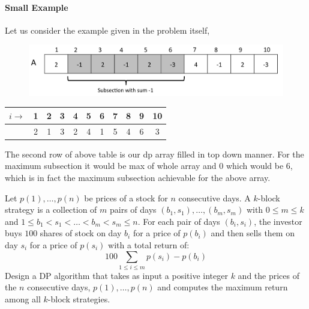 \documentclass[answers]{exam}
\begin{document}
\begin{questions}
\begin{solution}
\paragraph{Small Example}
Let us consider the example given in the problem itself,
\begin{figure}[H]
\centering
\includegraphics[scale=0.23]{embed/subsection}
\end{figure}
 \begin{center}
        \begin{tabular}{|c|c|c|c|c|c|c|c|c|c|c|}
            \hline
            $i \rightarrow$  & 1 & 2 & 3 & 4 & 5 & 6 & 7 & 8 & 9 & 10  \\
            \hline
             & 2 & 1 & 3 & 2 & 4 & 1 & 5 & 4 & 6 & 3 \\
            \hline
        \end{tabular}
    \end{center}
The second row of above table is our dp array filled in top down manner. 
\newline For the maximum subsection it would be max of whole array and 0 which would be 6, which is in fact the maximum subsection achievable for the above array.

\end{solution}

\question[20] Let $p(1),\dots,p(n)$ be prices of a stock for $n$ consecutive days. 
A $k$-block strategy is a collection of $m$ pairs of days $(b_1,s_1),\dots,(b_m,s_m)$ with $0\leq m \leq k$ and $1\leq b_1<s_1<\dots<b_m<s_m\leq n$. 
For each pair of days $(b_i, s_i)$, the investor buys $100$ shares of stock on day $b_i$ for a price of $p(b_i)$ and then sells them on day $s_i$ for a price of $p(s_i)$ with a total return of:
$$100\sum_{1\leq i \leq m}p(s_i)-p(b_i)$$
Design a DP algorithm that takes as input a positive integer $k$ and the prices of the $n$ consecutive days, $p(1),\dots,p(n)$ and computes the maximum return among all $k$-block strategies.

\begin{solution}

\end{solution}
\end{questions}
\end{document}
